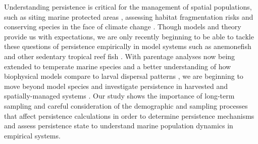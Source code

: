\documentclass[12pt, oneside]{article}   	%
\begin{document}

Understanding persistence is critical for the management of spatial populations, such as siting marine protected areas \citep{kaplan_model-based_2009}, assessing habitat fragmentation risks \citep{smith2002population, fahrig2001much} and conserving species in the face of climate change \citep{coleman2017anticipating, fuller2015persistence}. Though models and theory provide us with expectations, we are only recently beginning to be able to tackle these questions of persistence empirically in model systems such as anemonefish and other sedentary tropical reef fish \citep{salles_coral_2015,johnson2018integrating}. With parentage analyses now being extended to temperate marine species \citep{baetscher2019dispersal} and a better understanding of how biophysical models compare to larval dispersal patterns \citep{bode2019validation}, we are beginning to move beyond model species and investigate persistence in harvested and spatially-managed systems \citep{garavelli2018population}. Our study shows the importance of long-term sampling and careful consideration of the demographic and sampling processes that affect persistence calculations in order to determine persistence mechanisms and assess persistence state to understand marine population dynamics in empirical systems.
\end{document}

